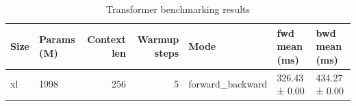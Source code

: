 \begin{table}
\caption{Transformer benchmarking results}
\label{tab:benchmarks}
\begin{tabular}{llrrlll}
\toprule
Size & Params (M) & Context len & Warmup steps & Mode & fwd mean (ms) & bwd mean (ms) \\
\midrule
xl & 1998 & 256 & 5 & forward_backward & 326.43 ± 0.00 & 434.27 ± 0.00 \\
\bottomrule
\end{tabular}
\end{table}
